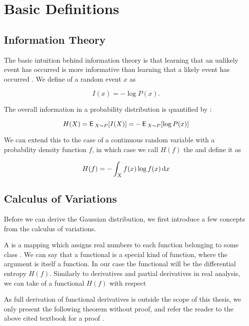 \chapter{Basic Definitions}

\section{Information Theory}

The basic intuition behind information theory is that learning that an unlikely event has occurred is more informative than learning that a likely event has occurred \citep{Goodfellow-et-al-2016}. We define  of a random event $x$ as

\begin{equation}
I(x) = -\log P(x).
\end{equation}

The overall information in a probability distribution is quantified by :

\begin{equation}
H(X) = \operatorname{\textsf{E}\,}_{X \sim P} [ I(X) ] = -\operatorname{\textsf{E}\,}_{X \sim P} [ \log P(x) ]
\end{equation}

We can extend this to the case of a continuous random variable with a probability density function $f$, in which case we call $H(f)$ the  and define it as

\begin{equation}
H(f) = - \int_X f(x) \log f(x) \mathop{}\!\mathrm{d} x
\end{equation}

\section{Calculus of Variations}

Before we can derive the Gaussian distribution, we first introduce a few concepts from the calculus of variations.

A  is a mapping which assigns real numbers to each function belonging to some class \citep{gelfand2012calculus}. We can say that a functional is a special kind of function, where the argument is itself a function. In our case the functional will be the differential entropy $H(f)$. Similarly to derivatives and partial derivatives in real analysis, we can take  of a functional $H(f)$ with respect

As full derivation of functional derivatives is outside the scope of this thesis, we only present the following theorem without proof, and refer the reader to the above cited textbook for a proof .

